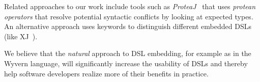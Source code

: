 \documentclass[preprint]{sigplanconf}
\begin{document}
Related approaches to our work include tools such as \textit{ProteaJ}~\cite{Ichikawa:2014:CUO:2584469.2577092} that uses \textit{protean operators} that resolve potential syntactic conflicts by looking at expected types.  An
alternative approach uses keywords to distinguish different embedded DSLs
(like XJ~\cite{DBLP:conf/scam/ClarkSW08}).

We believe that the \textit{natural} approach to DSL embedding, for example
as in the Wyvern language, will significantly increase the usability of DSLs
and thereby help software developers realize more of their benefits in
practice.




\end{document}
